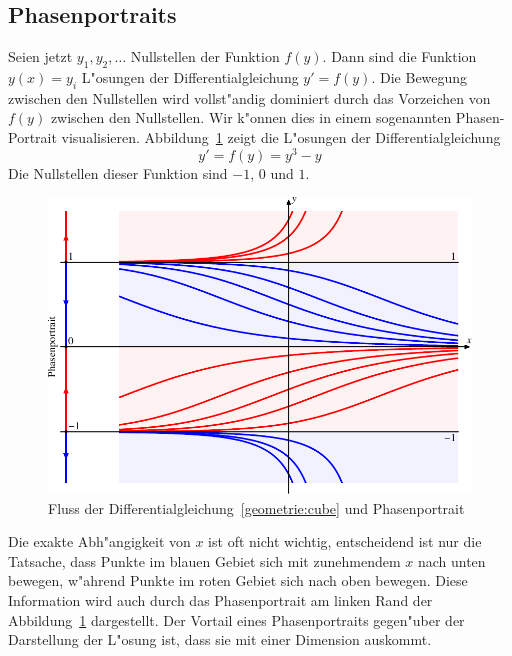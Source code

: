 \subsection{Phasenportraits}
Seien jetzt $y_1,y_2,\dots$ Nullstellen der Funktion $f(y)$.
Dann sind die Funktion $y(x)=y_i$ L"osungen der Differentialgleichung
$y'=f(y)$.
Die Bewegung zwischen den Nullstellen wird vollst"andig dominiert durch
das Vorzeichen von $f(y)$ zwischen den Nullstellen.
Wir k"onnen dies in einem sogenannten Phasen-Portrait visualisieren.
%
Abbildung~\ref{geometrie:phasenportrait} zeigt die L"osungen der
Differentialgleichung
\begin{equation}
y'=f(y)=y^3-y
\label{geometrie:cube}
\end{equation}
Die Nullstellen dieser Funktion sind $-1$, $0$ und $1$.
\begin{figure}
\centering
\includegraphics{chapters/images/geometrie-14.pdf}
\caption{Fluss der Differentialgleichung~\eqref{geometrie:cube} und
Phasenportrait
\label{geometrie:phasenportrait}}
\end{figure}
Die exakte Abh"angigkeit von $x$ ist oft nicht wichtig, entscheidend
ist nur die Tatsache, dass Punkte im blauen Gebiet sich mit zunehmendem
$x$ nach unten bewegen, w"ahrend Punkte im roten Gebiet sich nach
oben bewegen.
Diese Information wird auch durch das Phasenportrait am linken
Rand der Abbildung~\ref{geometrie:phasenportrait} dargestellt.
Der Vortail eines Phasenportraits gegen"uber der Darstellung
der L"osung ist, dass sie mit einer Dimension auskommt.

%
%
